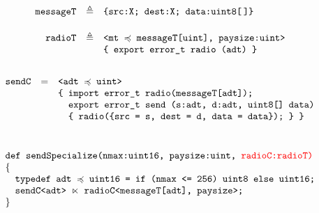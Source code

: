 $$
\begin{array}{rcl}
\texttt{messageT} &\triangleq& \texttt{\{src:X; dest:X; data:uint8[\,]\}} \\[5mm]
\texttt{radioT} &\triangleq& \texttt{<mt $\preccurlyeq$ messageT[uint], paysize:uint>} \\
 & & \texttt{\{\ export\  error\_t\ radio (adt)\ \}}\\[5mm]
\end{array} 
$$
$$
\begin{array}{lcl}
\texttt{sendC} & = & \texttt{<adt $\subtype$ uint>}\\
&& \texttt{\{ import error\_t radio(messageT[adt]);}\\
&& \texttt{\phantom{\{ }export error\_t send (s:adt, d:adt, uint8[] data)}\\
&& \texttt{\phantom{\{ }\{ radio(\{src = s, dest = d, data = data\}); \}\ \}}\\[10mm]
\multicolumn{3}{l}{\texttt{def sendSpecialize(nmax:uint16, paysize:uint, \color{red}{radioC:radioT})}}\\
\{\\
\multicolumn{3}{l}{\quad \texttt{typedef adt $\subtype$ uint16 = if (nmax <= 256) uint8 else uint16;}}\\
\multicolumn{3}{l}{\quad \texttt{sendC<adt> $\ltimes$ radioC<messageT[adt], paysize>;}}\\
\}
\end{array}
$$

\stopslide


